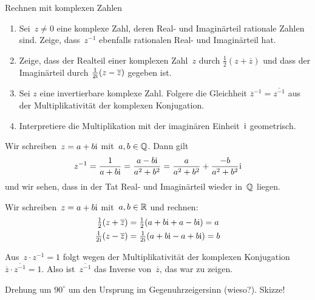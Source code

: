 \documentclass{algblatt}
\begin{document}
\ifloesungen\newpage\fi
\begin{aufgabe}{Rechnen mit komplexen Zahlen}
\begin{enumerate}
\item
Sei~$z \neq 0$ eine komplexe Zahl, deren Real- und Imaginärteil rationale
Zahlen sind. Zeige, dass~$z^{-1}$ ebenfalls rationalen Real- und Imaginärteil
hat.
\item
Zeige, dass der Realteil einer komplexen Zahl~$z$ durch
\(\frac 1 2 (z + \overline z)\)
und dass der Imaginärteil durch \(\frac 1 {2 \mathrm{i}} (z - \overline z)\)
gegeben ist.
\item
Sei \(z\) eine invertierbare komplexe Zahl. Folgere die Gleichheit
$
    \overline{z}^{-1} = \overline{z^{-1}}
$
aus der Multiplikativität der komplexen Konjugation.
\item
Interpretiere die Multiplikation mit der imaginären Einheit~$\mathrm{i}$
geometrisch.
\end{enumerate}
\begin{loesungE}
\item Wir schreiben~$z = a + b \mathrm{i}$ mit~$a,b \in \mathbb{Q}$. Dann gilt
\[ z^{-1} = \frac{1}{a + b \mathrm{i}} = \frac{a - b \mathrm{i}}{a^2 + b^2} =
  \frac{a}{a^2 + b^2} + \frac{-b}{a^2 + b^2} \mathrm{i} \]
und wir sehen, dass in der Tat Real- und Imaginärteil wieder in~$\mathbb{Q}$ liegen.
\item Wir schreiben~$z = a + b \mathrm{i}$ mit~$a,b \in \mathbb{R}$ und rechnen:
\begin{align*}
  \tfrac{1}{2} (z + \overline z) &= \tfrac{1}{2} (a + b \mathrm{i} + a - b \mathrm{i}) = a \\
  \tfrac{1}{2\mathrm{i}} (z - \overline z) &= \tfrac{1}{2\mathrm{i}} (a + b \mathrm{i} - a + b \mathrm{i}) = b
\end{align*}
\item Aus~$z \cdot z^{-1} = 1$ folgt wegen der Multiplikativität der komplexen
Konjugation $\overline z \cdot \overline{z^{-1}} = 1$. Also
ist~$\overline{z^{-1}}$ das Inverse von~$\overline{z}$, das war zu zeigen.
\item Drehung um $90^\circ$ um den Ursprung im Gegenuhrzeigersinn (wieso?). Skizze!
\end{loesungE}
\end{aufgabe}
\end{document}
